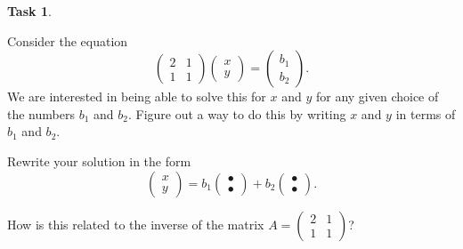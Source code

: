 \documentclass[10pt,]{book}
\theoremstyle{plain}
\theoremstyle{definition}
\numberwithin{equation}{section}
\newtheorem{task}{Task}[chapter]
\begin{document}
\begin{task}
\label{task-29}

          Consider the equation\[
            \begin{pmatrix} 2 & 1 \\ 1 & 1 \end{pmatrix}
            \begin{pmatrix} x \\ y \end{pmatrix} = \begin{pmatrix} b_1 \\ b_2
            \end{pmatrix}.
          \]
          We are interested in being able to solve this for \(x\) and \(y\)
          for any given choice of the numbers \(b_1\) and \(b_2\).
          Figure out a way to do this by writing \(x\) and \(y\) in terms
          of \(b_1\) and \(b_2\).
\par

          Rewrite your solution in the form\[
            \begin{pmatrix} x \\ y \end{pmatrix} = b_1 \begin{pmatrix}
            \bullet \\ \bullet\end{pmatrix} + b_2 \begin{pmatrix}  \bullet
            \\ \bullet \end{pmatrix}.
          \]
\par

          How is this related to the inverse of the matrix
          \(A = \left( \begin{smallmatrix} 2 & 1 \\ 1 & 1
          \end{smallmatrix} \right)\)?
\end{task}
\end{document}
